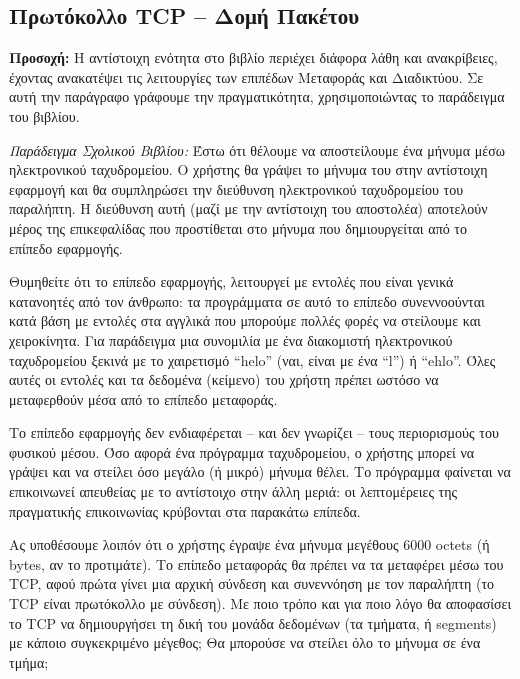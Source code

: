 %
%
\subsection{Πρωτόκολλο TCP -- Δομή Πακέτου}

\begin{inthebox}
\textbf{Προσοχή:} Η αντίστοιχη ενότητα στο βιβλίο περιέχει διάφορα λάθη και ανακρίβειες, έχοντας ανακατέψει τις λειτουργίες των επιπέδων Μεταφοράς και Διαδικτύου. Σε αυτή την παράγραφο γράφουμε την πραγματικότητα, χρησιμοποιώντας το παράδειγμα του βιβλίου.\\
\end{inthebox}


\emph{Παράδειγμα Σχολικού Βιβλίου:} Έστω ότι θέλουμε να αποστείλουμε ένα μήνυμα μέσω ηλεκτρονικού ταχυδρομείου. Ο χρήστης θα γράψει το μήνυμα του στην αντίστοιχη εφαρμογή και θα συμπληρώσει την διεύθυνση ηλεκτρονικού ταχυδρομείου του παραλήπτη. Η διεύθυνση αυτή (μαζί με την αντίστοιχη του αποστολέα) αποτελούν μέρος της επικεφαλίδας που προστίθεται στο μήνυμα που δημιουργείται από το επίπεδο εφαρμογής.

Θυμηθείτε ότι το επίπεδο εφαρμογής, λειτουργεί με εντολές που είναι γενικά κατανοητές από τον άνθρωπο: τα προγράμματα σε αυτό το επίπεδο συνεννοούνται κατά βάση με εντολές στα αγγλικά που μπορούμε πολλές φορές να στείλουμε και χειροκίνητα. Για παράδειγμα μια συνομιλία με ένα διακομιστή ηλεκτρονικού ταχυδρομείου ξεκινά με το χαιρετισμό ``helo'' (ναι, είναι με ένα ``l'') ή ``ehlo''. Όλες αυτές οι εντολές και τα δεδομένα (κείμενο) του χρήστη πρέπει ωστόσο να μεταφερθούν μέσα από το επίπεδο μεταφοράς.

Το επίπεδο εφαρμογής δεν ενδιαφέρεται -- και δεν γνωρίζει -- τους περιορισμούς του φυσικού μέσου. Όσο αφορά ένα πρόγραμμα ταχυδρομείου, ο χρήστης μπορεί να γράψει και να στείλει όσο μεγάλο (ή μικρό) μήνυμα θέλει. Το πρόγραμμα φαίνεται να επικοινωνεί απευθείας με το αντίστοιχο στην άλλη μεριά: οι λεπτομέρειες της πραγματικής επικοινωνίας κρύβονται στα παρακάτω επίπεδα.

Ας υποθέσουμε λοιπόν ότι ο χρήστης έγραψε ένα μήνυμα μεγέθους 6000 octets (ή bytes, αν το προτιμάτε). Το επίπεδο μεταφοράς θα πρέπει να τα μεταφέρει μέσω του TCP, αφού πρώτα γίνει μια αρχική σύνδεση και συνεννόηση με τον παραλήπτη (το TCP είναι πρωτόκολλο με σύνδεση). Με ποιο τρόπο και για ποιο λόγο θα αποφασίσει το TCP να δημιουργήσει τη δική του μονάδα δεδομένων (τα τμήματα, ή segments) με κάποιο συγκεκριμένο μέγεθος; Θα μπορούσε να στείλει όλο το μήνυμα σε ένα τμήμα;

